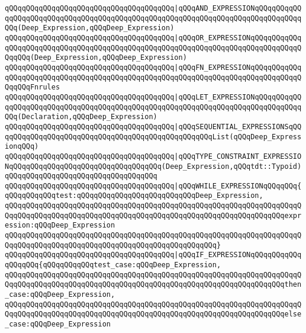 \verb|qQQqqQQqqQQqqQQqqQQqqQQqqQQqqQQqqQQqqQQq|\verb#|qQQqAND_EXPRESSIONqQQqqQQqqQQqqQQqqQQqqQQqqQQqqQQqqQQqqQQqqQQqqQQqqQQqqQQqqQQqqQQqqQQqqQQqqQQqqQQqqQQq(Deep_Expression,qQQqDeep_Expression)#\newline
\verb|qQQqqQQqqQQqqQQqqQQqqQQqqQQqqQQqqQQqqQQq|\verb#|qQQqOR_EXPRESSIONqQQqqQQqqQQqqQQqqQQqqQQqqQQqqQQqqQQqqQQqqQQqqQQqqQQqqQQqqQQqqQQqqQQqqQQqqQQqqQQqqQQqqQQq(Deep_Expression,qQQqDeep_Expression)#\newline
\verb|qQQqqQQqqQQqqQQqqQQqqQQqqQQqqQQqqQQqqQQq|\verb#|qQQqFN_EXPRESSIONqQQqqQQqqQQqqQQqqQQqqQQqqQQqqQQqqQQqqQQqqQQqqQQqqQQqqQQqqQQqqQQqqQQqqQQqqQQqqQQqqQQqqQQqFnrules#\newline
\verb|qQQqqQQqqQQqqQQqqQQqqQQqqQQqqQQqqQQqqQQq|\verb#|qQQqLET_EXPRESSIONqQQqqQQqqQQqqQQqqQQqqQQqqQQqqQQqqQQqqQQqqQQqqQQqqQQqqQQqqQQqqQQqqQQqqQQqqQQqqQQqqQQq(Declaration,qQQqDeep_Expression)#\newline
\verb|qQQqqQQqqQQqqQQqqQQqqQQqqQQqqQQqqQQqqQQq|\verb#|qQQqSEQUENTIAL_EXPRESSIONSqQQqqQQqqQQqqQQqqQQqqQQqqQQqqQQqqQQqqQQqqQQqqQQqqQQqList(qQQqDeep_ExpressionqQQq)#\newline
\verb|qQQqqQQqqQQqqQQqqQQqqQQqqQQqqQQqqQQqqQQq|\verb#|qQQqTYPE_CONSTRAINT_EXPRESSIONqQQqqQQqqQQqqQQqqQQqqQQqqQQqqQQqqQQq(Deep_Expression,qQQqtdt::Typoid)qQQqqQQqqQQqqQQqqQQqqQQqqQQqqQQqqQQq#\newline
\newline
\verb|qQQqqQQqqQQqqQQqqQQqqQQqqQQqqQQqqQQqqQQq|\verb#|qQQqWHILE_EXPRESSIONqQQqqQQq{qQQqqQQqqQQqtest:qQQqqQQqqQQqqQQqqQQqqQQqqQQqDeep_Expression,#\newline
\verb|qQQqqQQqqQQqqQQqqQQqqQQqqQQqqQQqqQQqqQQqqQQqqQQqqQQqqQQqqQQqqQQqqQQqqQQqqQQqqQQqqQQqqQQqqQQqqQQqqQQqqQQqqQQqqQQqqQQqqQQqqQQqqQQqqQQqqQQqexpression:qQQqDeep_Expression|\newline
\verb|qQQqqQQqqQQqqQQqqQQqqQQqqQQqqQQqqQQqqQQqqQQqqQQqqQQqqQQqqQQqqQQqqQQqqQQqqQQqqQQqqQQqqQQqqQQqqQQqqQQqqQQqqQQqqQQqqQQqqQQq}|\newline
\newline
\verb|qQQqqQQqqQQqqQQqqQQqqQQqqQQqqQQqqQQqqQQq|\verb#|qQQqIF_EXPRESSIONqQQqqQQqqQQqqQQqqQQq{qQQqqQQqqQQqtest_case:qQQqDeep_Expression,#\newline
\verb|qQQqqQQqqQQqqQQqqQQqqQQqqQQqqQQqqQQqqQQqqQQqqQQqqQQqqQQqqQQqqQQqqQQqqQQqqQQqqQQqqQQqqQQqqQQqqQQqqQQqqQQqqQQqqQQqqQQqqQQqqQQqqQQqqQQqqQQqthen_case:qQQqDeep_Expression,|\newline
\verb|qQQqqQQqqQQqqQQqqQQqqQQqqQQqqQQqqQQqqQQqqQQqqQQqqQQqqQQqqQQqqQQqqQQqqQQqqQQqqQQqqQQqqQQqqQQqqQQqqQQqqQQqqQQqqQQqqQQqqQQqqQQqqQQqqQQqqQQqelse_case:qQQqDeep_Expression|\newline
